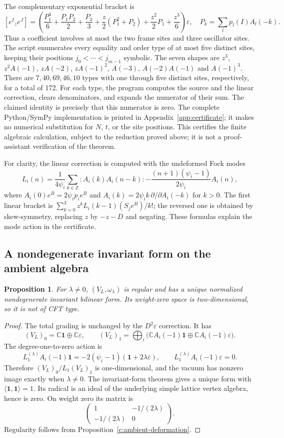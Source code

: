 \documentclass[11pt,a4paper]{article}
\numberwithin{equation}{section}
\newtheorem{proposition}[theorem]{Proposition}
\theoremstyle{definition}\newtheorem{definition}[theorem]{Definition}
\theoremstyle{remark}\newtheorem{remark}[theorem]{Remark}
\newcommand{\C}{\mathbb C}\newcommand{\Z}{\mathbb Z}\newcommand{\Q}{\mathbb Q}
\newcommand{\one}{\mathbf1}\newcommand{\B}{\mathcal B}\newcommand{\W}{W_N}
\begin{document}
The complementary exponential bracket is
\[
 [e^I{}_{z}e^J]=
 \left(\frac{P_1^3}{6}+\frac{P_1P_2}{2}+\frac{P_3}{3}
       +\frac z2(P_1^2+P_2)+\frac{z^2}2P_1+\frac{z^3}{6}\right)\varepsilon,
 \quad P_k=\sum_l p_l(I)A_l(-k).
\]
Thus a coefficient involves at most the two frame sites and three oscillator sites. The script enumerates every equality and order type of at most five distinct sites, keeping their positions $j_0<\cdots<j_{m-1}$ symbolic. The seven shapes are $z^3$, $z^2A(-1)$, $zA(-2)$, $zA(-1)^2$, $A(-3)$, $A(-2)A(-1)$ and $A(-1)^3$. There are $7,40,69,46,10$ types with one through five distinct sites,
respectively, for a total of 172. For each type, the program computes
the source and the linear correction, clears denominators, and expands
the numerator of their sum. The claimed identity is precisely that
this numerator is zero. The complete Python/SymPy implementation is
printed in Appendix~\ref{app:certificate}; it makes no numerical
substitution for $N$, $t$, or the site positions. This certifies the
finite algebraic calculation, subject to the reduction proved above;
it is not a proof-assistant verification of the theorem.

For clarity, the linear correction is computed with the undeformed
Fock modes
\[
 L_i(n)=\frac1{4\psi_i}\sum_{k\in\Z}:A_i(k)A_i(n-k):
 -\frac{(n+1)(\psi_i-1)}{2\psi_i}A_i(n),
\]
where $A_i(0)e^B=2\psi_ip_i e^B$ and
$A_i(k)=2\psi_i k\,\partial/\partial A_i(-k)$ for $k>0$.
The first linear bracket is
$\sum_{k=0}^3 z^k L_i(k-1)(S_je^B)/k!$; the reversed one is
obtained by skew-symmetry, replacing $z$ by $-z-D$ and negating.
These formulas explain the mode action in the certificate.
\subsection*{A nondegenerate invariant form on the ambient algebra}
\begin{proposition}\label{c:screening-form}
For $\lambda\ne0$, $(V_L,\omega_\lambda)$ is regular and has a unique normalized nondegenerate invariant bilinear form. Its weight-zero space is two-dimensional, so it is not of CFT type.
\end{proposition}
\begin{proof}
The total grading is unchanged by the $D^2\varepsilon$ correction. It has
\[
 (V_L)_0=\C\one\oplus\C\varepsilon,\qquad
 (V_L)_1=\bigoplus_i\big(\C A_i(-1)\one\oplus\C A_i(-1)\varepsilon\big).
\]
The degree-one-to-zero action is
\[
 L_1^{(\lambda)}A_i(-1)\one
   =-2(\psi_i-1)(\one+2\lambda\varepsilon),\qquad
 L_1^{(\lambda)}A_i(-1)\varepsilon=0.
\]
Therefore $(V_L)_0/L_1(V_L)_1$ is one-dimensional, and the vacuum has nonzero image exactly when $\lambda\ne0$. The invariant-form theorem \cite{c:LiForm} gives a unique form with $\langle\one,\one\rangle=1$. Its radical is an ideal of the underlying simple lattice vertex algebra, hence is zero. On weight zero its matrix is
\[
 \begin{pmatrix}1&-1/(2\lambda)\\-1/(2\lambda)&0\end{pmatrix}.
\]
Regularity follows from Proposition~\ref{c:ambient-deformation}.
\end{proof}
\end{document}
